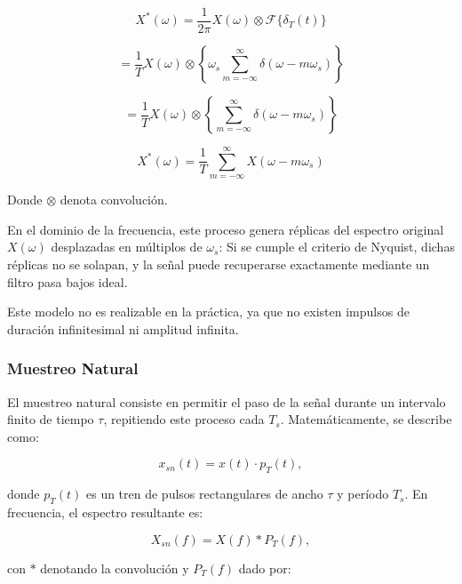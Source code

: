 \begin{equation}
    X^*(\omega) = \frac{1}{2\pi} X(\omega) \otimes \mathcal{F}\{\delta_T(t)\}
\end{equation}

\begin{equation}
    = \frac{1}{T} X(\omega) \otimes \left\{ \omega_s \sum_{m=-\infty}^{\infty} \delta(\omega - m\omega_s) \right\}
\end{equation}

\begin{equation}
    = \frac{1}{T} X(\omega) \otimes \left\{ \sum_{m=-\infty}^{\infty} \delta(\omega - m\omega_s) \right\}
\end{equation}

\begin{equation}
    X^*(\omega) = \frac{1}{T} \sum_{m=-\infty}^{\infty} X(\omega - m\omega_s)
\end{equation}


Donde $\otimes$ denota convolución. 


En el dominio de la frecuencia, este proceso genera réplicas del espectro original $X(\omega)$ desplazadas en múltiplos de $\omega_s$:
Si se cumple el criterio de Nyquist, dichas réplicas no se solapan, y la señal puede recuperarse
exactamente mediante un filtro pasa bajos ideal. 

\bigskip

Este modelo no es realizable en la práctica, ya que no existen impulsos de duración infinitesimal ni amplitud infinita.

\subsubsection{Muestreo Natural}
El muestreo natural consiste en permitir el paso de la señal durante un intervalo finito de tiempo $\tau$, repitiendo este proceso cada $T_s$. Matemáticamente, se describe como:

\begin{equation}
    x_{sn}(t) = x(t) \cdot p_T(t),
\end{equation}

donde $p_T(t)$ es un tren de pulsos rectangulares de ancho $\tau$ y período $T_s$.  
En frecuencia, el espectro resultante es:

\begin{equation}
    X_{sn}(f) = X(f) * P_T(f),
\end{equation}

con $*$ denotando la convolución y $P_T(f)$ dado por:

